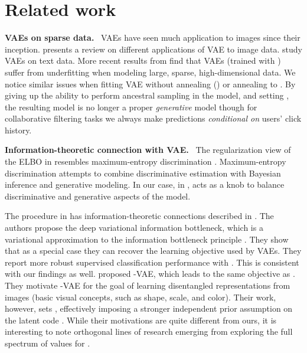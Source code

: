 \documentclass[sigconf]{acmart}
\DeclareRobustCommand{\parhead}[1]{\textbf{#1}~}
\begin{document}
\section{Related work} \label{sec:related}
\parhead{\Glspl{VAE} on sparse data.}
 \Glspl{VAE} \citep{kingma2013auto,rezende2014stochastic} have seen much application to images since their inception. 
\citet{doersch2016tutorial} presents a review on different applications of \gls{VAE} to image data. \citet{miao2016neural} study \gls{VAE}s on text data.
More recent results from \citet{krishnan2017challenge} find that \glspl{VAE} (trained with ) suffer from underfitting when modeling 
large, sparse, high-dimensional data. We notice similar issues when fitting \gls{VAE} without annealing () or annealing to .  
By giving up the ability to perform ancestral sampling in the model, and setting , the resulting model is 
no longer a proper \emph{generative} model though for collaborative filtering tasks we always make predictions \emph{conditional on} users' click history.

\parhead{Information-theoretic connection with \gls{VAE}.} 
The regularization view of the \gls{ELBO} in  
resembles maximum-entropy discrimination \citep{jaakkola2000maximum}. 
Maximum-entropy discrimination attempts to combine discriminative estimation with 
Bayesian inference and generative modeling. In our case, in ,  acts as a knob to balance 
discriminative and generative aspects of the model. 

The procedure in  has information-theoretic connections 
described in \citet{alemi2016deep}. The authors propose the deep variational information bottleneck, which is a variational approximation 
to the information 
bottleneck principle \citep{tishby2000information}. They show that as a special case they can recover the learning objective used
by \glspl{VAE}. They report more robust supervised classification performance 
with . This is consistent with our findings as well. 
\citet{higgins2017beta} proposed -\gls{VAE}, which leads 
to the same objective as . They motivate -\gls{VAE} for the goal of learning disentangled representations
from images (basic visual concepts, such as shape, scale, and color). Their work, however, sets , effectively imposing 
a stronger independent prior assumption on the latent code . While their motivations are quite different from ours, it is 
interesting to note orthogonal lines of research emerging from exploring the full spectrum of values for . 
\end{document}
